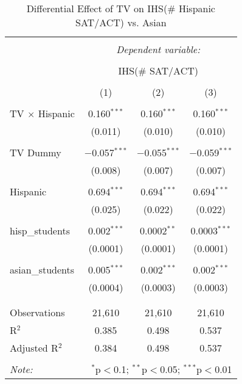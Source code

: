
\begin{table}[!htbp] \centering 
  \caption{Differential Effect of TV on IHS(\# Hispanic SAT/ACT) vs. Asian} 
  \label{} 
\begin{tabular}{@{\extracolsep{-2pt}}lccc} 
\\[-1.8ex]\hline 
\hline \\[-1.8ex] 
 & \multicolumn{3}{c}{\textit{Dependent variable:}} \\ 
\cline{2-4} 
\\[-1.8ex] & \multicolumn{3}{c}{IHS(\# SAT/ACT)} \\ 
\\[-1.8ex] & (1) & (2) & (3)\\ 
\hline \\[-1.8ex] 
 TV $\times$ Hispanic & 0.160$^{***}$ & 0.160$^{***}$ & 0.160$^{***}$ \\ 
  & (0.011) & (0.010) & (0.010) \\ 
  & & & \\ 
 TV Dummy & $-$0.057$^{***}$ & $-$0.055$^{***}$ & $-$0.059$^{***}$ \\ 
  & (0.008) & (0.007) & (0.007) \\ 
  & & & \\ 
 Hispanic & 0.694$^{***}$ & 0.694$^{***}$ & 0.694$^{***}$ \\ 
  & (0.025) & (0.022) & (0.022) \\ 
  & & & \\ 
 hisp\_students & 0.002$^{***}$ & 0.0002$^{**}$ & 0.0003$^{***}$ \\ 
  & (0.0001) & (0.0001) & (0.0001) \\ 
  & & & \\ 
 asian\_students & 0.005$^{***}$ & 0.002$^{***}$ & 0.002$^{***}$ \\ 
  & (0.0004) & (0.0003) & (0.0003) \\ 
  & & & \\ 
\hline \\[-1.8ex] 
Observations & 21,610 & 21,610 & 21,610 \\ 
R$^{2}$ & 0.385 & 0.498 & 0.537 \\ 
Adjusted R$^{2}$ & 0.384 & 0.498 & 0.537 \\ 
\hline 
\hline \\[-1.8ex] 
\textit{Note:}  & \multicolumn{3}{r}{$^{*}$p$<$0.1; $^{**}$p$<$0.05; $^{***}$p$<$0.01} \\ 
\end{tabular} 
\end{table} 

